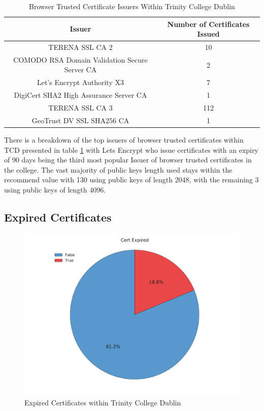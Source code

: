 \documentclass[a4wide,leqno,12pt]{report}
\begin{document}
\begin{table}[H]
\centering
\begin{tabular}{|| c c ||}
 \hline
  Issuer & Number of Certificates Issued  \\ [0.5ex]
 \hline\hline
TERENA SSL CA 2 & 10\\
COMODO RSA Domain Validation Secure Server CA &	2\\
Let's Encrypt Authority X3 & 7\\
DigiCert SHA2 High Assurance Server CA & 1\\
TERENA SSL CA 3 & 112 \\
GeoTrust DV SSL SHA256 CA & 1 \\[1ex]
 \hline
\end{tabular}
\caption{Browser Trusted Certificate Issuers Within Trinity College Dublin}
\label{table:Browser_Trusted_Issuers}
\end{table}
There is a breakdown of the top issuers of browser trusted certificates within TCD presented in table \ref{table:Browser_Trusted_Issuers} with Lets Encrypt who issue certificates with an expiry of 90 days \cite{LetsEncrypt} being the third most popular Issuer of browser trusted certificates in the college. The vast majority of public keys length used stays within the recommend value \cite{ssllabs} with 130 using public keys of length 2048, with the remaining 3 using public keys of length 4096.


\subsection{Expired Certificates}
\begin{figure}[H]
\centering
\includegraphics[scale=.5]{pdf_images/CertificateExpired}
\caption{Expired Certificates within Trinity College Dublin}
\label{fig:certExpired}
\end{figure}
\end{document}
